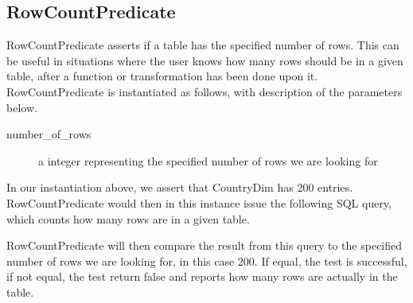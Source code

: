 \subsection{RowCountPredicate}
RowCountPredicate asserts if a table has the specified number of rows. This can be useful in situations where the user knows how many rows should be in a given table, after a function or transformation has been done upon it. RowCountPredicate is instantiated as follows, with description of the parameters below.


\begin{description}
\item [number\_of\_rows] a integer representing the specified number of rows we are looking for
\end{description}

In our instantiation above, we assert that CountryDim has 200 entries.  
RowCountPredicate would then in this instance issue the following SQL query, which counts how many rows are in a given table.


RowCountPredicate will then compare the result from this query to the specified number of rows we are looking for, in this case 200. If equal, the test is successful, if not equal, the test return false and reports how many rows are actually in the table.

